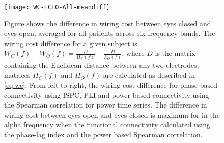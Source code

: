 \documentclass[11pt, onecolumn]{article}
\begin{document}

 
\begin{figure}[h]
        \centering
        \texttt{[image: WC-ECEO-All-meandiff]}
        \caption{Figure shows the difference in wiring cost between eyes closed and eyes open, averaged for all patients across six frequency bands. The wiring cost difference for a given subject is $W_C(f) - W_O(f) = \frac{D}{H_{C}(f)} - \frac{D}{h_{O}(f)}$, where $D$ is the matrix containing the Euclidean distance between any two electrodes, matrices $H_{C}(f)$ and $H_{O}(f)$ are calculated as described in \ref{eq:wc}. From left to right, the wiring cost difference for phase-based connectivity using ISPC, PLI and power-based connectivity using the Spearman correlation for power time series. The difference in wiring cost between eyes open and eyes closed is maximum for in the alpha frequency when the functional connectivity calculated using the phase-lag index and the power based Spearman correlation.}
        \label{fig:figi-1}
\end{figure}
\end{document}
